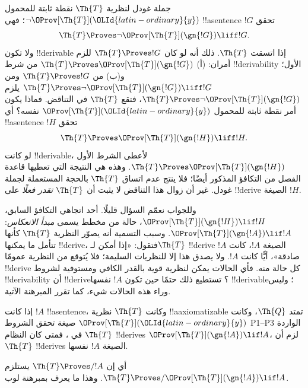 \documentclass[../../../include/open-logic-section]{subfiles}
\begin{document}


جملة غودل لنظرية $\Th{T}$ نقطة ثابتة للمحمول $\lnot
\OProv[\Th{T}](\OLId{latin-ordinary}{y})$؛ فهي !!a{sentence} $!G$ تحقق
\[
\Th{T} \Proves \lnot \OProv[\Th{T}](\gn{!G}) \liff !G.
\]
ولا تكون !!{derivable} إذا اتسقت $\Th{T}$.
ذلك أنه لو كان $\Th{T} \Proves !G$ للزم أمران:
(أ) $\Th{T} \Proves \OProv[\Th{T}](\gn{!G})$ من شرط
!!{derivability} الأول؛ و(ب) من $\Th{T} \Proves !G$
ومن $\Th{T} \Proves \lnot \OProv[\Th{T}](\gn{!G})
\liff !G$ يلزم $\Th{T} \Proves \lnot \OProv[\Th{T}](\gn{!G})$،
فتقع $\Th{T}$ في التناقض. فماذا يكون أمر نقطة ثابتة للمحمول
$\OProv[\Th{T}](\OLId{latin-ordinary}{y})$ نفسه؟ أي !!a{sentence} $!H$ تحقق
\[
\Th{T} \Proves \OProv[\Th{T}](\gn{!H}) \liff !H.
\]
لو كانت !!{derivable}، لأعطى الشرط الأول
$\Th{T} \Proves \OProv[\Th{T}](\gn{!H})$.
وهذه هي النتيجة التي تعطيها قاعدة الفصل من التكافؤ المذكور أيضًا؛
فلا ينتج عدم اتساق $\Th{T}$ بالحجة المستعملة لجملة غودل.
غير أن زوال هذا التناقض لا يثبت أن $\Th{T}$
\emph{تقدر فعلًا} على !!{derive} الصيغة $!H$.

وللجواب نعمّم السؤال قليلًا. أحد اتجاهي التكافؤ السابق،
$\OProv[\Th{T}](\gn{!H}) \lif !H$، حالة من مخطط يسمى
\emph{مبدأ الانعكاس}: $\OProv[\Th{T}](\gn{!A}) \lif !A$.
وسبب التسمية أنه يصوّر النظرية $\Th{T}$ كأنها تتأمل ما يمكنها
!!{derive}، فتقول: «إذا أمكن لـ$\Th{T}$ !!{derive}
الصيغة $!A$، كانت $!A$ صادقة»، أيًّا كانت $!A$.
ولا يصدق هذا إلا للنظريات السليمة؛ فلا يُتوقع من النظرية عمومًا
!!{derive} كل حالة منه. فأي الحالات يمكن لنظرية قوية بالقدر
الكافي ومستوفية لشروط !!{derivability} أن !!{derive}؟
تستطيع ذلك حتمًا حين تكون $!A$ نفسها !!{derivable}؛ وليس وراء
هذه الحالات شيء، كما تقرر المبرهنة الآتية.

\begin{thm}
إذا كانت $!A$ !!a{sentence}، وكانت $\Th{T}$ نظرية
!!a{axiomatizable} تمتد $\Th{Q}$، وكانت
$\OProv[\Th{T}](\OLId{latin-ordinary}{y})$ صيغة تحقق الشروط P1--P3 الواردة في
، فمتى كان النظام $\Th{T}$ !!{derive}s
$\OProv[\Th{T}](\gn{!A}) \lif !A$، لزم أن $\Th{T}$
!!{derive}s الصيغة $!A$ نفسها.
\end{thm}

أي إن $\Th{T} \Proves/ !A$ يستلزم
$\Th{T} \Proves/ \OProv[\Th{T}](\gn{!A}) \lif !A$.
وهذا ما يعرف بمبرهنة لوب.
\end{document}
